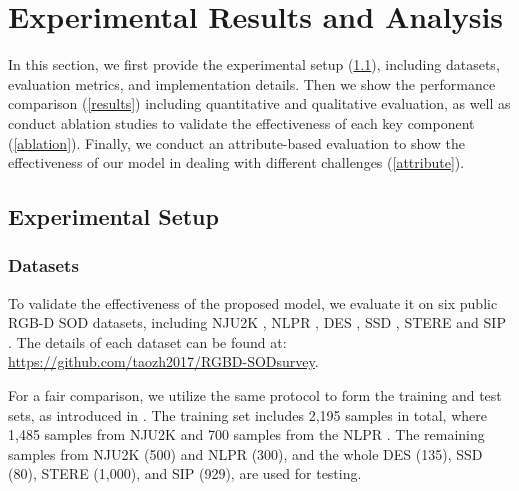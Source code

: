 \documentclass[10pt,twocolumn,letterpaper]{article}
\begin{document}
\section{Experimental Results and Analysis}

In this section, we first provide the experimental setup (\ref{setup}), including datasets, evaluation metrics, and implementation details. Then we show the performance comparison (\ref{results}) including quantitative and qualitative evaluation, as well as conduct ablation studies to validate the effectiveness of each key component (\ref{ablation}). Finally, we conduct an attribute-based evaluation to show the effectiveness of our model in dealing with different challenges (\ref{attribute}).

\subsection{Experimental Setup}
\label{setup}

\subsubsection{Datasets}
To validate the effectiveness of the proposed model, we evaluate it on six public RGB-D SOD datasets, including NJU2K \cite{ju2014depth}, NLPR \cite{peng2014rgbd}, DES \cite{cheng2014depth}, SSD \cite{zhu2017three}, STERE \cite{niu2012leveraging} and SIP \cite{fan2019rethinking}. The details of each dataset can be found at: \url{https://github.com/taozh2017/RGBD-SODsurvey}.


For a fair comparison, we utilize the same protocol to form the training and test sets, as introduced in \cite{piao2019depth,fan2019rethinking}. The training set includes 2,195 samples in total, where 1,485 samples from NJU2K \cite{ju2014depth} and 700 samples from the NLPR \cite{peng2014rgbd}. The remaining samples from NJU2K (500) and NLPR (300), and the whole DES (135), SSD (80), STERE (1,000), and SIP (929), are used for testing.
\end{document}
